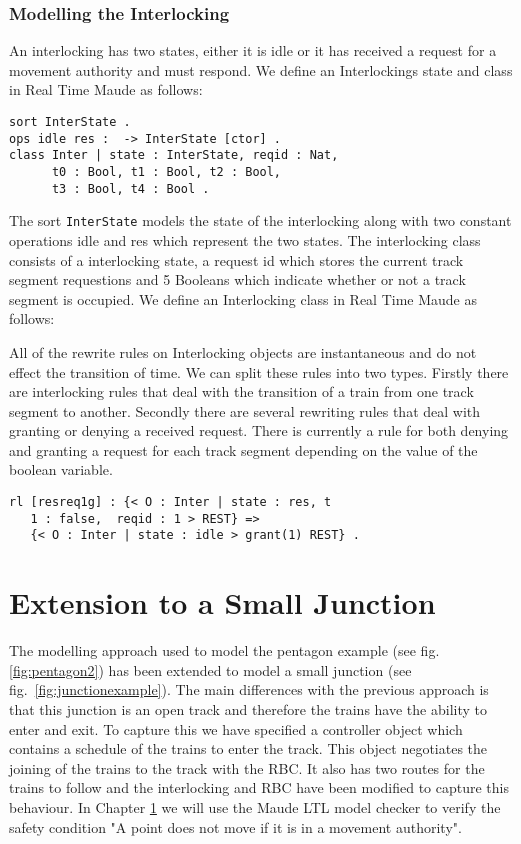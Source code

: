 \subsubsection*{Modelling the Interlocking}
An interlocking has two states, either it is idle or it has received a request for a movement authority and must respond. We define an Interlockings state and class in Real Time Maude as follows:

\begin{lstlisting}[caption = The interlocking class and states in Maude]
sort InterState .
ops idle res :  -> InterState [ctor] .
class Inter | state : InterState, reqid : Nat, 
      t0 : Bool, t1 : Bool, t2 : Bool, 
      t3 : Bool, t4 : Bool .
\end{lstlisting}

The sort \texttt{InterState} models the state of the interlocking along with two constant operations idle and res which represent the two states. The interlocking class consists of a interlocking state, a request id which stores the current track segment requestions and 5 Booleans which indicate whether or not a track segment is occupied. We define an Interlocking class in Real Time Maude as follows:


All of the rewrite rules on Interlocking objects are instantaneous and do not effect the transition of time.  We can split these rules into two types. Firstly there are interlocking rules that deal with the transition of a train from one track segment to another. Secondly there are several rewriting rules that deal with granting or denying a received request. There is currently a rule for both denying and granting a request for each track segment depending on the value of the boolean variable.

\begin{lstlisting}[caption = The interlocking transition which grants a track segment request]
rl [resreq1g] : {< O : Inter | state : res, t
   1 : false,  reqid : 1 > REST} => 
   {< O : Inter | state : idle > grant(1) REST} .
\end{lstlisting}

\section{Extension to a Small Junction}
The modelling approach used to model the pentagon example (see fig. \ref{fig:pentagon2}) has been extended to model a small junction (see fig.~\ref{fig:junctionexample}). The main differences with the previous approach is that this junction is an open track and therefore the trains have the ability to enter and exit. To capture this we have specified a controller object which contains a schedule of the trains to enter the track. This object negotiates the joining of the trains to the track with the RBC. It also has two routes for the trains to follow and the interlocking and RBC have been modified to capture this behaviour.  In Chapter \ref{} we will use the Maude LTL model checker to verify the safety condition "A point does not move if it is in a movement authority".
 
